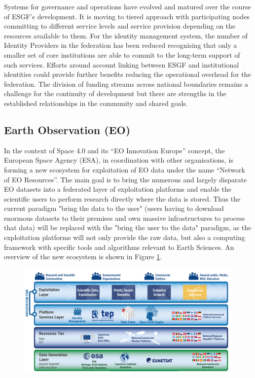 \documentclass[fleqn,10pt]{wlscirep}
\begin{document}
{Systems for governance and operations have evolved and matured over the course of ESGF's development. It is moving to tiered approach with participating nodes committing to different service levels and service provision depending on the resources available to them. For the identity management system, the number of Identity Providers in the federation has been reduced recognising that only a smaller set of core institutions are able to commit to the long-term support of such services. Efforts around account linking between ESGF and institutional identities could provide further benefits reducing the operational overhead for the federation. The division of funding streams across national boundaries remains a challenge for the continuity of development but there are strengths in the established relationships in the community and shared goals.

\subsection{Earth Observation (EO)}

In the context of Space 4.0 and its “EO Innovation Europe” concept, the European Space Agency (ESA), in coordination with other organisations, is forming a new ecosystem for exploitation of EO data under the name “Network of EO Resources”. The main goal is to bring the numerous and largely disparate EO datasets into a federated layer of exploitation platforms and enable the scientific users to perform research directly where the data is stored. Thus the current paradigm "bring the data to the user" (users having to download enormous datasets to their premises and own massive infrastructures to process that data) will be replaced with the "bring the user to the data" paradigm, as the exploitation platforms will not only provide the raw data, but also a computing framework with specific tools and algorithms relevant to Earth Sciences. An overview of the new ecosystem is shown in Figure \ref{fig:eo}.

\begin{figure}[ht!]
\centering
\includegraphics[width=0.7\columnwidth]{eo.png}
\caption{}
\label{fig:eo}
\end{figure}

}
\end{document}
